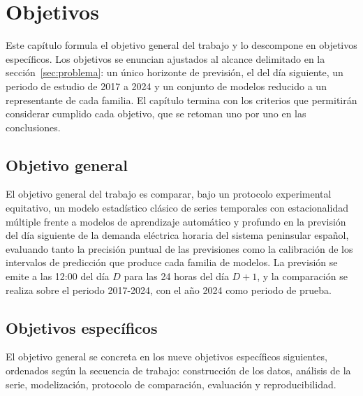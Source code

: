 
\chapter{Objetivos}\label{cap:objetivos}

Este capítulo formula el objetivo general del trabajo y lo descompone en
objetivos específicos. Los objetivos se enuncian ajustados al alcance
delimitado en la sección~\ref{sec:problema}: un único horizonte de previsión,
el del día siguiente, un periodo de estudio de 2017 a 2024 y un conjunto de
modelos reducido a un representante de cada familia. El capítulo termina con
los criterios que permitirán considerar cumplido cada objetivo, que se retoman
uno por uno en las conclusiones.

\section{Objetivo general}\label{sec:objetivo-general}

El objetivo general del trabajo es comparar, bajo un protocolo experimental
equitativo, un modelo estadístico clásico de series temporales con
estacionalidad múltiple frente a modelos de aprendizaje automático y profundo
en la previsión del día siguiente de la demanda eléctrica horaria del sistema
peninsular español, evaluando tanto la precisión puntual de las previsiones
como la calibración de los intervalos de predicción que produce cada familia
de modelos. La previsión se emite a las 12:00 del día $D$ para las 24 horas
del día $D+1$, y la comparación se realiza sobre el periodo 2017-2024, con el
año 2024 como periodo de prueba.

\section{Objetivos específicos}\label{sec:objetivos-especificos}

El objetivo general se concreta en los nueve objetivos específicos siguientes,
ordenados según la secuencia de trabajo: construcción de los datos, análisis
de la serie, modelización, protocolo de comparación, evaluación y
reproducibilidad.

